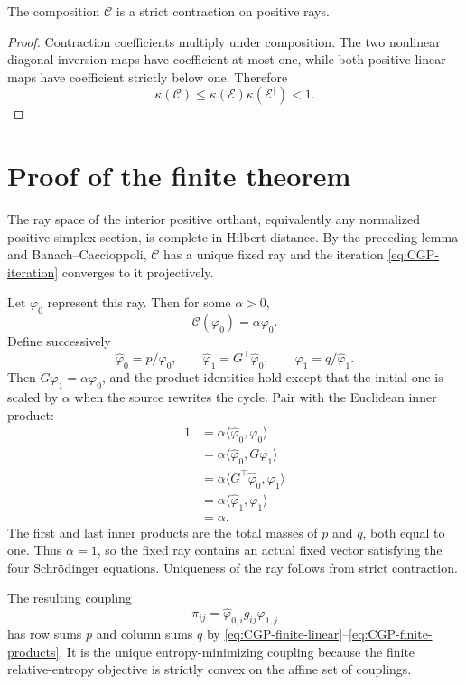 \begin{lemma}
The composition $\mathcal C$ is a strict contraction on positive rays.
\end{lemma}
\begin{proof}
Contraction coefficients multiply under composition.  The two nonlinear diagonal-inversion maps
have coefficient at most one, while both positive linear maps have coefficient strictly below one.
Therefore
\[
 \kappa(\mathcal C)
 \le\kappa(\mathcal E)\kappa(\mathcal E^\dagger)<1.
\]
\end{proof}

\section{Proof of the finite theorem}
The ray space of the interior positive orthant, equivalently any normalized positive simplex
section, is complete in Hilbert distance.  By the preceding lemma and Banach--Caccioppoli,
$\mathcal C$ has a unique fixed ray and the iteration \eqref{eq:CGP-iteration} converges to it
projectively.

Let $\varphi_0$ represent this ray.  Then for some $\alpha>0$,
\begin{equation}
 \mathcal C(\varphi_0)=\alpha\varphi_0.
 \label{eq:CGP-alpha-ray}
\end{equation}
Define successively
\[
 \widehat\varphi_0=p/\varphi_0,
 \qquad
 \widehat\varphi_1=G^\top\widehat\varphi_0,
 \qquad
 \varphi_1=q/\widehat\varphi_1.
\]
Then $G\varphi_1=\alpha\varphi_0$, and the product identities hold except that the initial one is
scaled by $\alpha$ when the source rewrites the cycle.  Pair with the Euclidean inner product:
\begin{align*}
 1
 &=\alpha\langle\widehat\varphi_0,\varphi_0\rangle\\
 &=\alpha\langle\widehat\varphi_0,G\varphi_1\rangle\\
 &=\alpha\langle G^\top\widehat\varphi_0,\varphi_1\rangle\\
 &=\alpha\langle\widehat\varphi_1,\varphi_1\rangle\\
 &=\alpha.
\end{align*}
The first and last inner products are the total masses of $p$ and $q$, both equal to one.  Thus
$\alpha=1$, so the fixed ray contains an actual fixed vector satisfying the four Schr\"odinger
equations.  Uniqueness of the ray follows from strict contraction.

The resulting coupling
\[
 \pi_{ij}=\widehat\varphi_{0,i}g_{ij}\varphi_{1,j}
\]
has row sums $p$ and column sums $q$ by \eqref{eq:CGP-finite-linear}--\eqref{eq:CGP-finite-products}.
It is the unique entropy-minimizing coupling because the finite relative-entropy objective is
strictly convex on the affine set of couplings.

